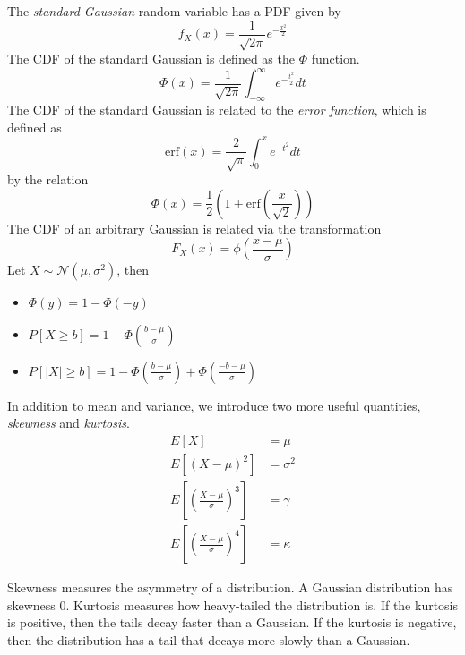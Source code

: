 The \emph{standard Gaussian} random variable has a
PDF given by
\begin{equation}
    f_X(x) = \frac{1}{\sqrt{2\pi}} e^{-\frac{x^2}{2}}
\end{equation}
The CDF of the standard Gaussian is defined
as the $\Phi$ function.
\begin{equation}
    \Phi(x) = \frac{1}{\sqrt{2\pi}}\int_{-\infty}^{\infty} e^{-\frac{t^2}{2}}dt
\end{equation}
The CDF of the standard Gaussian is related to the
\emph{error function}, which is defined as
\begin{equation}
    \text{erf}(x) = \frac{2}{\sqrt{\pi}} \int_{0}^{x} e^{-t^2} dt
\end{equation}
by the relation
\begin{equation}
    \Phi(x) = \frac{1}{2} \left(1 + \text{erf}\left(\frac{x}{\sqrt{2}}\right)\right)
\end{equation}
The CDF of an arbitrary Gaussian is related via
the transformation
\begin{equation}
    F_X(x) = \phi\left(\frac{x - \mu}{\sigma}\right)
\end{equation}
Let $X \sim \mathcal{N}(\mu, \sigma^2)$, then
\begin{itemize}
    \item $\Phi(y) = 1 -\Phi(-y)$
    \item $P[X\geq b] = 1 - \Phi(\frac{b-\mu}{\sigma})$
    \item $P[|X| \geq b] = 1 - \Phi(\frac{b-\mu}{\sigma}) + \Phi(\frac{-b-\mu}{\sigma})$
\end{itemize}

In addition to mean and variance, we introduce
two more useful quantities, \emph{skewness} and
\emph{kurtosis}.
\begin{align}
    E\left[X\right]                                   & = \mu      \\
    E\left[(X - \mu)^2\right]                         & = \sigma^2 \\
    E\left[\left(\frac{X-\mu}{\sigma}\right)^3\right] & = \gamma   \\
    E\left[\left(\frac{X-\mu}{\sigma}\right)^4\right] & = \kappa
\end{align}

Skewness measures the asymmetry of a
distribution. A Gaussian distribution has
skewness 0. Kurtosis measures how heavy-tailed
the distribution is. If the kurtosis is
positive, then the tails decay faster than a
Gaussian. If the kurtosis is negative, then
the distribution has a tail that
decays more slowly than a Gaussian.

